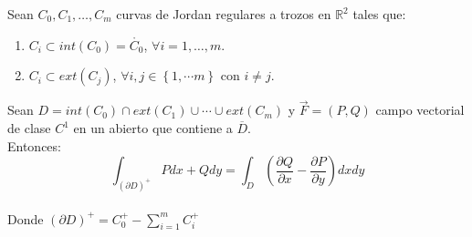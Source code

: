 \begin{teorema}
    Sean $C_0, C_1, \ldots, C_m$ curvas de Jordan regulares a trozos en $\mathbb{R}^2$ tales que:\\
    \begin{enumerate}
        \item $C_i \subset int(C_0) = \mathring{C_0}$, $\forall i = 1, \ldots, m$.
        \item $C_i \subset ext(C_j)$, $\forall i, j \in \left\{1, \cdots m\right\}$ con $i \neq j$.
    \end{enumerate}
    Sean $D=int(C_0) \cap ext(C_1) \cup \cdots \cup ext(C_m)$ y $\vec{F} = (P,Q)$ campo vectorial de clase $C^1$ en un abierto que contiene a $\overline{D}$.\\
    Entonces:
    $$\int_{\left(\partial D\right)^+} Pdx + Qdy = \int_{D} \left(\frac{\partial Q}{\partial x} - \frac{\partial P}{\partial y}\right) dxdy$$\\
    Donde $\left(\partial D\right)^+ = C_0^+ - \sum_{i=1}^{m} C_i^+$\\
\end{teorema}